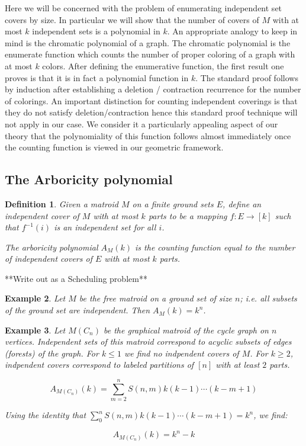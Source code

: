 \documentclass[12pt,reqno]{amsart}
\newtheorem{definition}{Definition}
\numberwithin{definition}{section}
\newtheorem{example}[definition]{Example}
\begin{document}
Here we will be concerned with the problem of enumerating independent
set covers by size.  In particular we will show that the number of
covers of $M$ with at most $k$ independent sets is a polynomial in
$k$.  An appropriate analogy to keep in mind is the chromatic
polynomial of a graph.  The chromatic polynomial is the enumerate
function which counts the number of proper coloring of a graph with at
most $k$ colors.  After defining the enumerative function, the first
result one proves is that it is in fact a polynomial function in $k$.
The standard proof follows by induction after establishing a deletion
/ contraction recurrence for the number of colorings.  An important
distinction for counting independent coverings is that they do not
satisfy deletion/contraction hence this standard proof technique will
not apply in our case.  We consider it a particularly appealing aspect
of our theory that the polynomiality of this function follows almost
immediately once the counting function is viewed in our geometric
framework.

\subsection{The Arboricity polynomial}

\begin{definition} Given a matroid $M$ on a finite ground sets $E$, define an independent cover of $M$ with at most $k$ parts to be a mapping $f : E \rightarrow [k]$ such that $f^{-1}(i)$ is an independent set for all $i$.  

  The arboricity polynomial $A_M(k)$ is the counting function equal to the number of independent covers of $E$ with at most $k$ parts.
\end{definition}

**Write out as a  Scheduling problem**

\begin{example}

Let $M$ be the free matroid on a ground set of size $n$; i.e. all subsets of the ground set are independent.  Then $A_M(k) = k^n$.  

\end{example}

\begin{example}

Let $M(C_n)$ be the graphical matroid of the cycle graph on $n$
vertices.  Independent sets of this matroid correspond to acyclic
subsets of edges (forests) of the graph.  For $k \leq 1$ we find no
indpendent covers of $M$.  For $k \geq 2$, indpendent covers
correspond to labeled partitions of $[n]$ with at least $2$ parts.

$$A_{M(C_n)}(k) = \sum_{m=2}^{n} S(n,m) k(k-1) \cdots (k-m+1) $$

Using the identity that $\sum_0^n S(n,m) k(k-1) \cdots (k-m+1) = k^n$, we find:

$$A_{M(C_n)}(k) = k^n - k $$

\end{example}
\end{document}

